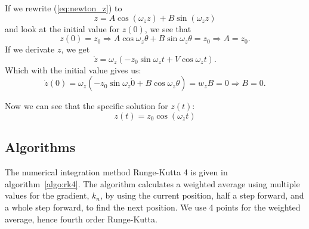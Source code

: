 \documentclass[english,notitlepage,reprint,nofootinbib]{revtex4-1}  %
\begin{document}
	If we rewrite (\ref{eq:newton_z}) to 
	\begin{equation*}
		z = A \cos (\omega_z z) + B \sin (\omega_z z)
	\end{equation*}
	and look at the initial value for $z(0)$, we see that
	\begin{equation*}
		z(0) = z_0 \Rightarrow A \cos \omega_z \theta + B \sin \omega_z \theta = z_0 \Rightarrow A = z_0.
	\end{equation*}
	If we derivate $z$, we get 
	\begin{equation*}
		\dot{z} = \omega_z (-z_0 \sin \omega_z t + V \cos \omega_z t).
	\end{equation*}
	Which with the initial value gives us:
	\begin{equation*}
		\dot{z}(0) = \omega_z (- z_0 \sin \omega_z \dot 0 + B \cos \omega_z \theta) = w_z B = 0 \Rightarrow B = 0.
	\end{equation*}
	
	Now we can see that the specific solution for $z(t)$:
	\begin{equation*}
		z(t) = z_0 \cos (\omega_z t)
	\end{equation*}
	
	
\subsection*{Algorithms}
%
The numerical integration method Runge-Kutta\cite{runge-kutta4} 4 is given in algorithm~\ref{algo:rk4}. The algorithm calculates a weighted average using multiple values for the gradient, $k_n$, by using the current position, half a step forward, and a whole step forward, to find the next position. We use 4 points for the weighted average, hence fourth order Runge-Kutta.
\end{document}
